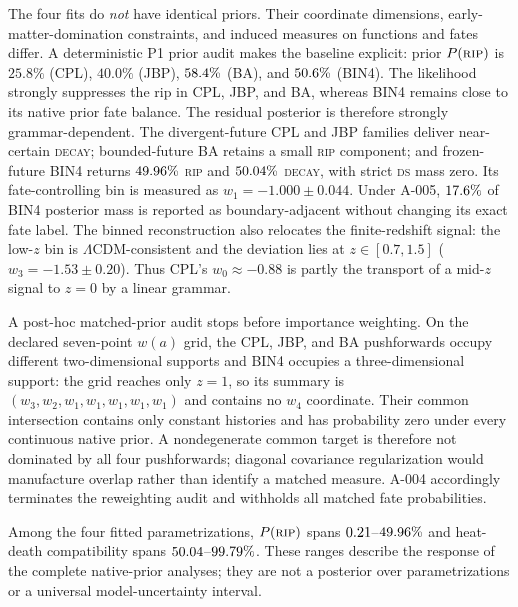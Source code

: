 \documentclass[a4paper,11pt]{article}
\newcommand{\lcdm}{\ensuremath{\Lambda\mathrm{CDM}}}
\newcommand{\wz}{\ensuremath{w_0}}
\begin{document}
The four fits do \emph{not} have identical priors. Their coordinate
dimensions, early-matter-domination constraints, and induced measures on
functions and fates differ. A deterministic P1 prior audit makes the baseline
explicit: prior $P(\textsc{rip})$ is $25.8\%$ (CPL), $40.0\%$ (JBP),
$58.4\%$ (BA), and $50.6\%$ (BIN4). The likelihood strongly suppresses the
rip in CPL, JBP, and BA, whereas BIN4 remains close to its native prior fate
balance. The residual posterior is therefore strongly grammar-dependent.
The divergent-future CPL and JBP families deliver
near-certain \textsc{decay}; bounded-future BA retains a small
\textsc{rip} component; and frozen-future BIN4 returns
$49.96\%$ \textsc{rip} and $50.04\%$ \textsc{decay}, with strict
\textsc{ds} mass zero.
Its fate-controlling bin is measured as $w_1=-1.000\pm0.044$. Under A-005,
$17.6\%$ of BIN4 posterior mass is reported as boundary-adjacent
without changing its exact fate label. The binned reconstruction also relocates the
finite-redshift signal: the low-$z$ bin is \lcdm-consistent and the deviation
lies at $z\in[0.7,1.5]$ ($w_3=-1.53\pm0.20$). Thus CPL's
$\wz\approx-0.88$ is partly the transport of a mid-$z$ signal to $z=0$ by a
linear grammar.

A post-hoc matched-prior audit stops before importance weighting. On the
declared seven-point $w(a)$ grid, the CPL, JBP, and BA pushforwards occupy
different two-dimensional supports and BIN4 occupies a three-dimensional
support: the grid reaches only $z=1$, so its summary is
$(w_3,w_2,w_1,w_1,w_1,w_1,w_1)$ and contains no $w_4$ coordinate. Their
common intersection contains only constant histories and has
probability zero under every continuous native prior. A nondegenerate common
target is therefore not dominated by all four pushforwards; diagonal
covariance regularization would manufacture overlap rather than identify a
matched measure. A-004 accordingly terminates the reweighting audit and
withholds all matched fate probabilities.

Among the four fitted parametrizations,
$P(\textsc{rip})$ spans $0.21$--$49.96\%$ and
heat-death compatibility spans
$50.04$--$99.79\%$. These ranges describe the
response of the complete native-prior analyses; they are not a posterior over
parametrizations or a universal model-uncertainty interval.
\end{document}
